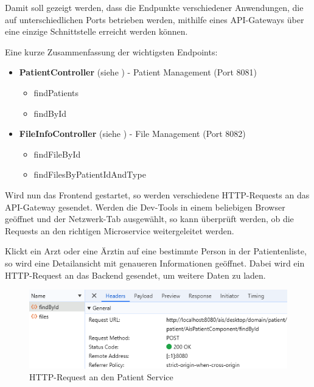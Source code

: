     

    Damit soll gezeigt werden, dass die Endpunkte verschiedener Anwendungen, die auf unterschiedlichen Ports betrieben werden, mithilfe eines API-Gateways über eine einzige Schnittstelle erreicht werden können.

    \clearpage

    Eine kurze Zusammenfassung der wichtigsten Endpoints:
    \begin{itemize}
        \item \textbf{PatientController} (siehe ) - Patient Management (Port 8081)
        \begin{itemize}[label=$\circ$]
            \item findPatients
            \item findById
        \end{itemize}
        
        \item \textbf{FileInfoController} (siehe ) - File Management (Port 8082)
        \begin{itemize}[label=$\circ$]
            \item findFileById
            \item findFilesByPatientIdAndType
        \end{itemize}
    \end{itemize}

    Wird nun das Frontend gestartet, so werden verschiedene HTTP-Requests an das API-Gateway gesendet. 
    Werden die Dev-Tools in einem beliebigen Browser geöffnet und der Netzwerk-Tab ausgewählt, so kann überprüft werden, ob die Requests an den richtigen Microservice weitergeleitet werden.

    Klickt ein Arzt oder eine Ärztin auf eine bestimmte Person in der Patientenliste, so wird eine Detailansicht mit genaueren Informationen geöffnet. Dabei wird ein HTTP-Request an das Backend gesendet, um weitere Daten zu laden. 

    \begin{figure}[H]
        \centering
        \includegraphics[width=1\linewidth]{images/EA/patient-management-http-request.png}
        \caption{HTTP-Request an den Patient Service}
        \label{fig:patient-management-http-request}
    \end{figure}

